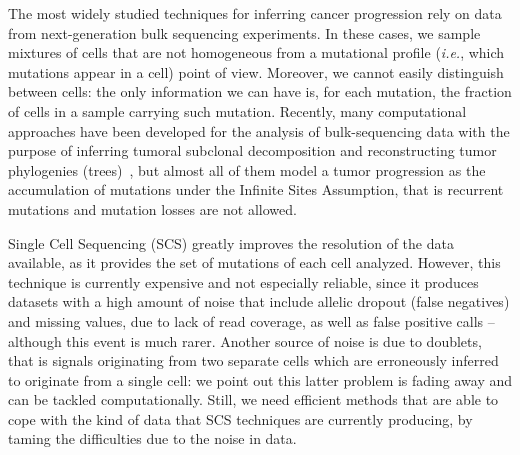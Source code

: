\documentclass[a4paper,USenglish]{article}
\newcommand{\ie}{\emph{i.e.}}
\theoremstyle{definition}
\begin{document}
The most widely studied techniques for inferring cancer progression
rely on data from next-generation bulk sequencing experiments.  In
these cases, we sample mixtures of cells that are not homogeneous from
a mutational profile (\ie, which mutations appear in a cell) point of
view.  Moreover, we cannot easily distinguish between cells: the only
information we can have is, for each mutation, the fraction of cells
in a sample carrying such mutation.  Recently, many computational
approaches have been developed for the analysis of bulk-sequencing
data with the purpose of inferring tumoral subclonal decomposition and
reconstructing tumor phylogenies
(trees)~\cite{Strino2013,Jiao2014,Hajirasouliha2014,Yuan2015,Popic2015,citup,El-Kebir2016,marass2016,doi:10.1093/bioinformatics/btx270,Bonizzoni:2017:BPP:3107411.3107441},
but almost all of them model a tumor progression as the accumulation
of mutations under the Infinite Sites Assumption, that is recurrent
mutations and mutation losses are not allowed.

Single Cell Sequencing (SCS) greatly improves the resolution of the
data available, as it provides the set of mutations of each cell
analyzed.  However, this technique is currently expensive and not
especially reliable, since it produces datasets with a high amount of
noise that include allelic dropout (false negatives) and missing
values, due to lack of read coverage, as well as false positive calls
-- although this event is much rarer.  Another source of noise is due
to doublets, that is signals originating from two separate cells which
are erroneously inferred to originate from a single cell: we point out
this latter problem is fading away and can be tackled computationally.
Still, we need efficient methods that are able to cope with the kind
of data that SCS techniques are currently producing, by taming the
difficulties due to the noise in data.
\end{document}
